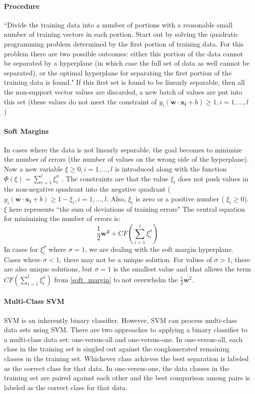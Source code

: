 			\paragraph{Procedure} ``Divide the training data into a number of portions with a reasonable small number of training vectors in each portion.  Start out by solving the quadratic programming problem determined by the first portion of training data.  For this problem there are two possible outcomes: either this portion of the data cannot be separated by a hyperplane (in which case the full set of data as well cannot be separated), or the optimal hyperplane for separating the first portion of the training data is found." If this first set is found to be linearly separable, then all the non-support vector values are discarded, a new batch of values are put into this set (these values do not meet the constraint of $y_i(\mathbf{w} \cdot \mathbf{x_i} + b) \ge 1, i = 1,...,{l}$ )
			\paragraph{Soft Margins}
			In cases where the data is not linearly separable, the goal becomes to minimize the number of errors (the number of values on the wrong side of the hyperplane).  Now a new variable $\xi \ge 0, i=1,...,l$ is introduced along with the function $\Phi (\xi) = \sum_{i=1}^{l} \xi_{i}^{\sigma}$ .  The constraints are that the value $\xi_i$ does not push values in the non-negative quadrant into the negative quadrant ( $y_i(\mathbf{w} \cdot \mathbf{x_i} + b) \ge 1 - \xi_i, i=1,...,l$.  Also, $\xi_i$ is zero or a positive number ( $\xi_i \ge 0$).  $\xi$ here represents ``the sum of deviations of training errors"
			The central equation for minimizing the number of errors is:
			\begin{equation}\label{soft_margin}  \frac{1}{2}\mathbf{w^2} + CF(\sum_{i=1}^{l} \xi_{i}^\sigma)\end{equation}
			In cases for $ \xi_{i}^{\sigma} $ where $\sigma=1$, we are dealing with the soft margin hyperplane.  Cases where $\sigma < 1$, there may not be a unique solution.  For values of $\sigma > 1$, there are also unique solutions, but $\sigma =1$ is the smallest value and that allows the term $CF(\sum_{i=1}^{l} \xi_{i}^\sigma)$ from \eqref{soft_margin} to not overwhelm  the $\frac{1}{2}\mathbf{w}^2$.\cite{vapnik_support-vector_1995}
			\paragraph{Multi-Class SVM}  SVM is an inherently binary classifier.  However, SVM can process multi-class data sets using SVM.  There are two approaches to applying a binary classifier to a multi-class data set: one-versus-all and one-versus-one.  In one-versus-all, each class in the training set is singled out against the conglomerated remaining classes in the training set.  Whichever class achieves the best separation is labeled as the correct class for that data.  In one-versus-one, the data classes in the training set are paired against each other and the best comparison among pairs is labeled as the correct class for that data.  
